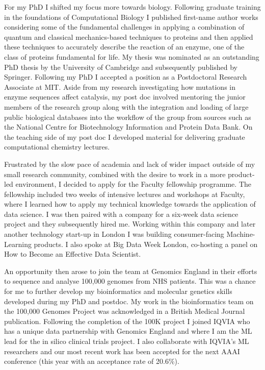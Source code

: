 \documentclass[11pt,a4paper,sans]{moderncv}        %
\begin{document}
%
For my PhD I shifted my focus more towards biology. 
%
Following graduate training in the foundations of 
Computational Biology I published first-name author
works considering some of the fundamental challenges
in applying a combination of 
quantum and classical mechanics-based techniques
to proteins\cite{jpcm} and then applied these techniques 
to accurately describe the reaction of an enzyme\cite{jpcl},
one of the class of proteins fundamental for life.
%
My thesis was nominated as an outstanding
PhD thesis by the University of Cambridge
and subsequently published by 
Springer\cite{springer_thesis}.
%
Following my PhD I accepted a position as a 
Postdoctoral Research Associate at MIT\cite{mit}. 
%
Aside from my research investigating 
how mutations in enzyme sequences affect catalysis,
my post doc involved mentoring
the junior members of the research group along
with the integration and loading of 
large public biological databases 
into the workflow of the group from sources 
such as the National Centre for Biotechnology 
Information and 
Protein Data Bank.
%
On the teaching side of my post doc I developed material for 
delivering graduate computational chemistry 
lectures.
%

%
Frustrated by the slow pace of academia
and lack of wider impact outside of my 
small research community, combined with the desire to
work in a more product-led environment, I decided to apply 
for the Faculty fellowship programme.
%
%
%
The fellowship included two weeks of 
intensive lectures and workshops at Faculty, 
where I learned how to apply 
my technical knowledge towards the application of 
data science.
% 
I was then paired with a company 
for a six-week data science project and they subsequently 
hired me.
%
Working within this company and 
later another technology start-up in London
I was building consumer-facing Machine-Learning
products. 
%
I also spoke at Big Data Week London, co-hosting 
a panel on How to Become an Effective Data Scientist\cite{BDW}.

%
An opportunity then arose to join the team at 
Genomics England in their efforts to sequence
and analyse 100,000 genomes from NHS patients.
%
This was a chance for me to further develop my
bioinformatics and molecular genetics skills developed
during my PhD and postdoc.
%
My work in the bioinformatics team 
on the 100,000 Genomes Project was 
acknowledged in a British Medical Journal publication\cite{gel_bmj}.
%
Following the completion of the 100K project
I joined IQVIA who has a unique data partnership
with Genomics England and where I am the ML 
lead for the in silico clinical trials project.
%
I also collaborate with IQVIA's ML researchers
and our most recent work 
has been accepted for the next AAAI conference\cite{conan} 
(this year with an acceptance rate 
of 20.6\%).
%
\end{document}
